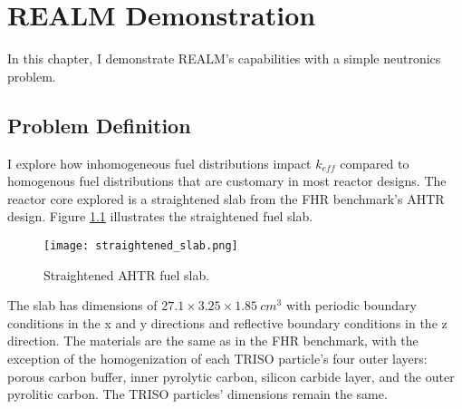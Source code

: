 \chapter{REALM Demonstration}
In this chapter, I demonstrate \gls{REALM}'s capabilities with a simple neutronics 
problem. 

\section{Problem Definition}
I explore how inhomogeneous fuel distributions impact $k_{eff}$ compared to 
homogenous fuel distributions that are customary in most reactor designs. 
The reactor core explored is a straightened slab from the \gls{FHR} benchmark's
\gls{AHTR} design.
Figure \ref{fig:straightened_slab} illustrates the straightened fuel slab. 
\begin{figure}[]
    \centering
    \texttt{[image: straightened\_slab.png]}
    \raggedright
    \caption{Straightened \acrfull{AHTR} fuel slab.}
    \label{fig:straightened_slab}
\end{figure}
The slab has dimensions of $27.1 \times 3.25 \times 1.85\ cm^3$
with periodic boundary conditions in the x and y directions and reflective 
boundary conditions in the z direction. 
The materials are the same as in the \gls{FHR} benchmark, with the exception 
of the homogenization of each \gls{TRISO} particle's four outer layers: 
porous carbon buffer, inner pyrolytic carbon, silicon carbide layer, and the 
outer pyrolitic carbon. 
The \gls{TRISO} particles' dimensions remain the same.

